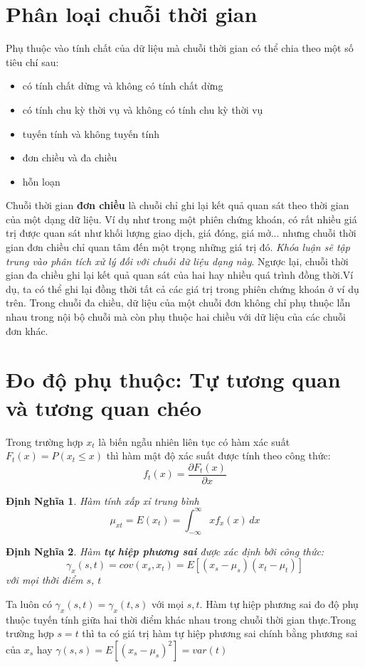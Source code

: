 \documentclass[twoside,12pt]{Latex/Classes/PhDthesisPSnPDF}
\newtheorem{defi}{Định Nghĩa}[chapter]
\begin{document}
\section{Phân loại chuỗi thời gian}
Phụ thuộc vào tính chất của dữ liệu mà chuỗi thời gian có thể chia theo một số tiêu chí\cite{cits} sau:
\begin{itemize}
	\item có tính chất dừng và không có tính chất dừng
	\item có tính chu kỳ thời vụ và không có tính chu kỳ thời vụ
	\item tuyến tính và không tuyến tính
	\item đơn chiều và đa chiều
	\item hỗn loạn
\end{itemize}
Chuỗi thời gian \textbf{đơn chiều} là chuỗi chỉ ghi lại  kết quả quan sát theo thời gian của một dạng dữ liệu. Ví dụ như trong một phiên chứng khoán, có rất nhiều giá trị được quan sát như khối lượng giao dịch, giá đóng, giá mở... nhưng chuỗi thời gian đơn chiều chỉ quan tâm đến một trọng những giá trị đó. \textit{Khóa luận sẽ tập trung vào phân tích xử lý đối với chuỗi dữ liệu dạng này}. 
Ngược lại, chuỗi thời gian đa chiều ghi lại kết quả quan sát của hai hay nhiều quá trình đồng thời.Ví dụ, ta có thể ghi lại đồng thời tất cả các giá trị trong phiên chứng khoán ở ví dụ trên. Trong chuỗi đa chiều, dữ liệu của một chuỗi đơn không chỉ phụ thuộc lẫn nhau trong nội bộ chuỗi mà còn phụ thuộc hai chiều với dữ liệu của các chuỗi đơn khác. 

\section{Đo độ phụ thuộc: Tự tương quan và tương quan chéo}
Trong trường hợp $x_t$ là biến ngẫu nhiên liên tục có hàm xác suất $F_t(x)=P(x_t\leq x)$ thì hàm mật độ xác suất được tính theo công thức:
	\begin{equation}
		f_t(x)  = \frac{\partial F_t(x)}{\partial x}
	\end{equation}
	\begin{defi} Hàm tính xấp xỉ trung bình
		\begin{equation}
			\mu_{xt} = E(x_t) = \int_{-\infty}^\infty \! xf_x(x) \, dx
		\end{equation}
	\end{defi}
	
	\begin{defi}
		Hàm \textbf{tự hiệp phương sai} được xác định bởi công thức:
		\begin{equation}
			\gamma_x(s,t) = cov(x_s,x_t) = E[(x_s-\mu_s)(x_t-\mu_t)]
		\end{equation}	
		với mọi thời điểm $s$, $t$
	\end{defi}
	Ta luôn có $\gamma_x(s,t) = \gamma_x(t,s)$ với mọi $s,t$. Hàm tự hiệp phương sai đo độ phụ thuộc tuyến tính giữa hai thời điểm khác nhau trong chuỗi thời gian thực.Trong trường hợp $s=t$ thì ta có giá trị hàm tự hiệp phương sai chính bằng phương sai của $x_s$ hay $\gamma(s,s) = E[(x_s-\mu_s)^2] = var(t)$ 
\end{document}

